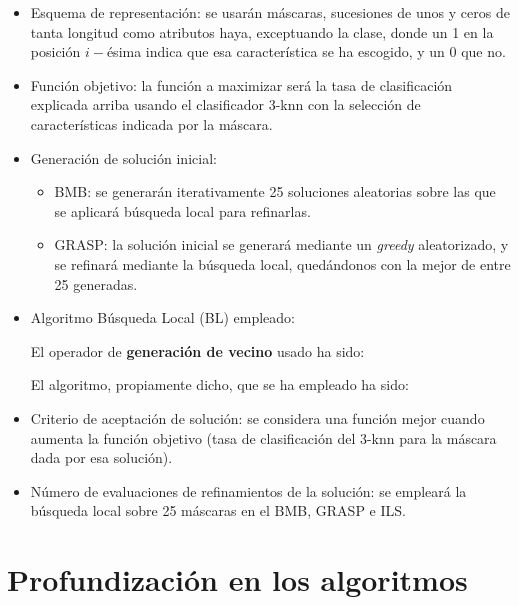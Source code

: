 \documentclass[a4paper,11pt]{article}
\begin{document}
\begin{itemize} 
\item Esquema de representación: se usarán máscaras, sucesiones de unos y ceros de tanta longitud como atributos haya,
exceptuando la clase, donde un 1 en la posición $i-$ésima indica que esa característica se ha escogido, y un $0$ que no.

\item Función objetivo: la función a maximizar será la tasa de clasificación explicada arriba usando el clasificador
3-knn con la selección de características indicada por la máscara.

\small\texttt{}

\item Generación de solución inicial: 
  \begin{itemize}
   \item BMB: se generarán iterativamente 25 soluciones aleatorias sobre las que se aplicará búsqueda local
   para refinarlas.
   \item GRASP: la solución inicial se generará mediante un \textit{greedy} aleatorizado, y se refinará mediante
   la búsqueda local, quedándonos con la mejor de entre 25 generadas.
  \end{itemize}


\item Algoritmo Búsqueda Local (BL) empleado:
  
  El operador de \textbf{generación de vecino} usado ha sido:
  
  \small\texttt{}
  
  El algoritmo, propiamente dicho, que se ha empleado ha sido:
  
  \small\texttt{}

\item Criterio de aceptación de solución: se considera una función mejor cuando aumenta la función objetivo (tasa de 
clasificación del 3-knn para la máscara dada por esa solución).
  
\item Número de evaluaciones de refinamientos de la solución: se empleará la búsqueda local sobre 25
máscaras en el BMB, GRASP e ILS.

\end{itemize}

\section{Profundización en los algoritmos}
\end{document}
